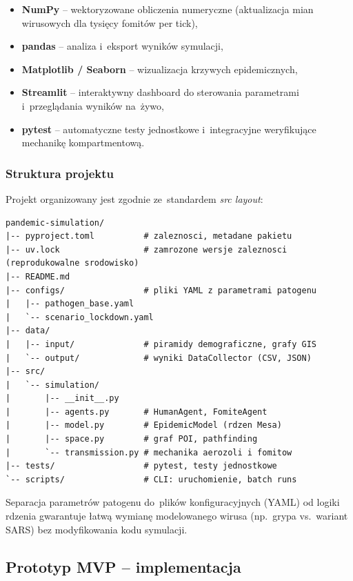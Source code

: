 \documentclass[polish]{projectreport}
\begin{document}
\begin{itemize}
  \item \textbf{NumPy} -- wektoryzowane obliczenia numeryczne (aktualizacja mian
        wirusowych dla tysięcy fomitów per tick),
  \item \textbf{pandas} -- analiza i~eksport wyników symulacji,
  \item \textbf{Matplotlib / Seaborn} -- wizualizacja krzywych epidemicznych,
  \item \textbf{Streamlit} -- interaktywny dashboard do sterowania parametrami
        i~przeglądania wyników na~żywo,
  \item \textbf{pytest} -- automatyczne testy jednostkowe i~integracyjne
        weryfikujące mechanikę kompartmentową.
\end{itemize}

\subsubsection{Struktura projektu}
\label{sec:project-structure}

Projekt organizowany jest zgodnie ze~standardem \textit{src layout}:

\begin{lstlisting}[language={}, escapeinside={}, caption={Planowana struktura katalogów projektu},
  label=lst:structure]
pandemic-simulation/
|-- pyproject.toml          # zaleznosci, metadane pakietu
|-- uv.lock                 # zamrozone wersje zaleznosci (reprodukowalne srodowisko)
|-- README.md
|-- configs/                # pliki YAML z parametrami patogenu
|   |-- pathogen_base.yaml
|   `-- scenario_lockdown.yaml
|-- data/
|   |-- input/              # piramidy demograficzne, grafy GIS
|   `-- output/             # wyniki DataCollector (CSV, JSON)
|-- src/
|   `-- simulation/
|       |-- __init__.py
|       |-- agents.py       # HumanAgent, FomiteAgent
|       |-- model.py        # EpidemicModel (rdzen Mesa)
|       |-- space.py        # graf POI, pathfinding
|       `-- transmission.py # mechanika aerozoli i fomitow
|-- tests/                  # pytest, testy jednostkowe
`-- scripts/                # CLI: uruchomienie, batch runs
\end{lstlisting}

Separacja parametrów patogenu do~plików konfiguracyjnych (YAML) od logiki
rdzenia gwarantuje łatwą wymianę modelowanego wirusa (np.\ grypa vs.~wariant
SARS) bez modyfikowania kodu symulacji.

\subsection{Prototyp MVP -- implementacja}
\label{sec:mvp}
\end{document}
